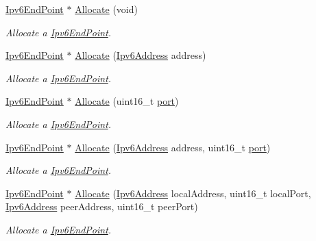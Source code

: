 \begin{DoxyCompactItemize}
\hyperlink{classns3_1_1Ipv6EndPoint}{Ipv6\+End\+Point} $\ast$ \hyperlink{classns3_1_1Ipv6EndPointDemux_a586cf13b626d18745734faf36ecdd158}{Allocate} (void)
\begin{DoxyCompactList}\small\item\em Allocate a \hyperlink{classns3_1_1Ipv6EndPoint}{Ipv6\+End\+Point}. \end{DoxyCompactList}\item 
\hyperlink{classns3_1_1Ipv6EndPoint}{Ipv6\+End\+Point} $\ast$ \hyperlink{classns3_1_1Ipv6EndPointDemux_a3fc063aa047ecc9221973f7955ad9140}{Allocate} (\hyperlink{classns3_1_1Ipv6Address}{Ipv6\+Address} address)
\begin{DoxyCompactList}\small\item\em Allocate a \hyperlink{classns3_1_1Ipv6EndPoint}{Ipv6\+End\+Point}. \end{DoxyCompactList}\item 
\hyperlink{classns3_1_1Ipv6EndPoint}{Ipv6\+End\+Point} $\ast$ \hyperlink{classns3_1_1Ipv6EndPointDemux_ab17c1b5847287c9ae042fa46c70bafc3}{Allocate} (uint16\+\_\+t \hyperlink{visualizer-ideas_8txt_a21ff1c530daf8435e00048b7fc2c58e3}{port})
\begin{DoxyCompactList}\small\item\em Allocate a \hyperlink{classns3_1_1Ipv6EndPoint}{Ipv6\+End\+Point}. \end{DoxyCompactList}\item 
\hyperlink{classns3_1_1Ipv6EndPoint}{Ipv6\+End\+Point} $\ast$ \hyperlink{classns3_1_1Ipv6EndPointDemux_a76e87f15a9a4bdac12bc24ff8ea4dba8}{Allocate} (\hyperlink{classns3_1_1Ipv6Address}{Ipv6\+Address} address, uint16\+\_\+t \hyperlink{visualizer-ideas_8txt_a21ff1c530daf8435e00048b7fc2c58e3}{port})
\begin{DoxyCompactList}\small\item\em Allocate a \hyperlink{classns3_1_1Ipv6EndPoint}{Ipv6\+End\+Point}. \end{DoxyCompactList}\item 
\hyperlink{classns3_1_1Ipv6EndPoint}{Ipv6\+End\+Point} $\ast$ \hyperlink{classns3_1_1Ipv6EndPointDemux_a4e5ec48817546606ae47001c0c5db9c7}{Allocate} (\hyperlink{classns3_1_1Ipv6Address}{Ipv6\+Address} local\+Address, uint16\+\_\+t local\+Port, \hyperlink{classns3_1_1Ipv6Address}{Ipv6\+Address} peer\+Address, uint16\+\_\+t peer\+Port)
\begin{DoxyCompactList}\small\item\em Allocate a \hyperlink{classns3_1_1Ipv6EndPoint}{Ipv6\+End\+Point}. \end{DoxyCompactList}\item 

\end{DoxyCompactItemize}
